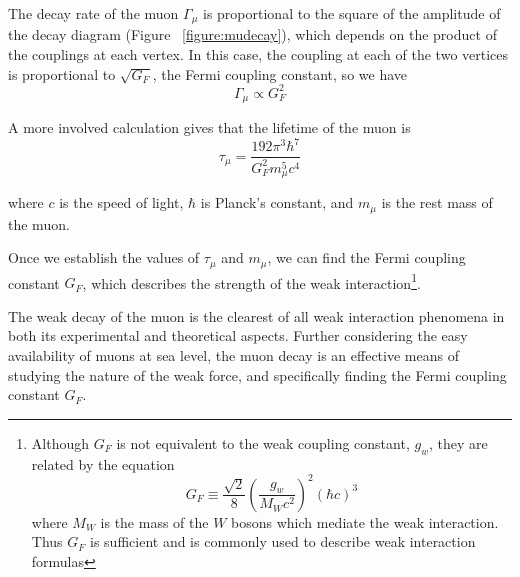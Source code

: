 The decay rate of the muon $\Gamma_{\mu}$ is proportional to the
square of the amplitude of the decay diagram (Figure
~\ref{figure:mudecay}), which depends on the product of the couplings
at each vertex. In this case, the coupling at each of the two vertices
is proportional to $\sqrt{G_F}$, the Fermi coupling constant, so we
have
\begin{equation}\Gamma_{\mu} \propto G_F^2 \end{equation}

A more involved calculation \cite[p.~310-314]{griffiths} gives that the
lifetime of the muon is
\begin{equation}\tau_{\mu} = \dfrac{192\pi^3\hbar^7}{G_F^2m_{\mu}^5c^4}\label{gf}\end{equation}

where $c$ is the speed of light, $\hbar$ is Planck's constant, and
$m_{\mu}$ is the rest mass of the muon. 

Once we establish the values of $\tau_{\mu}$ and $m_{\mu}$, we can
find the Fermi coupling constant $G_F$, which describes the strength
of the weak interaction\footnote{Although $G_F$ is not equivalent to
the weak coupling constant, $g_w$, they are related by the equation
\[G_F\equiv \frac{\sqrt{2}}{8}\left(\frac{g_w}{M_Wc^2}\right)^2(\hbar c)^3\]
where $M_W$ is the mass of the $W$ bosons which mediate the weak
interaction. Thus $G_F$ is sufficient and is commonly used to describe
weak interaction formulas\cite[p.~313]{griffiths}}.

The weak decay of the muon is the clearest of all weak interaction
phenomena in both its experimental and theoretical aspects. Further
considering the easy availability of muons at sea level, the
muon decay is an effective means of studying the nature of the weak
force, and specifically finding the Fermi coupling constant $G_F$.
